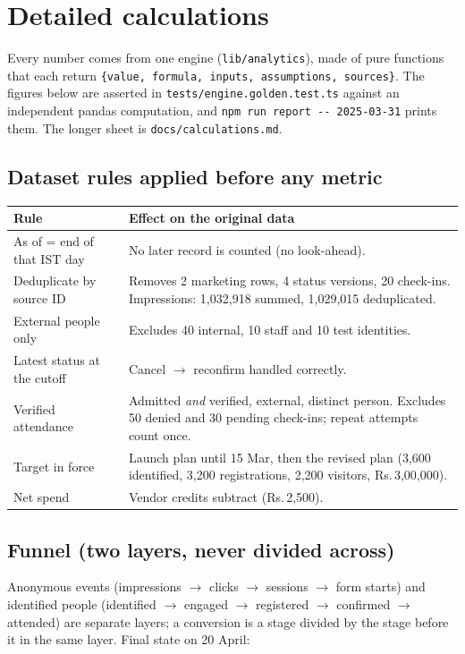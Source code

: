 \documentclass[11pt,a4paper]{article}
\newcommand{\rs}{Rs.\,}
\newcommand{\code}[1]{\texttt{#1}}
\begin{document}
\section{Detailed calculations}\label{sec:calc}
Every number comes from one engine (\code{lib/analytics}), made of pure functions that each return \code{\{value, formula, inputs, assumptions, sources\}}. The figures below are asserted in \code{tests/engine.golden.test.ts} against an independent pandas computation, and \code{npm run report -{}- 2025-03-31} prints them. The longer sheet is \code{docs/calculations.md}.

\subsection{Dataset rules applied before any metric}\label{sec:calc-rules}
\begin{tabularx}{\linewidth}{@{}p{4.2cm}L@{}}
\toprule
\textbf{Rule} & \textbf{Effect on the original data} \\
\midrule
As of = end of that IST day & No later record is counted (no look-ahead). \\
Deduplicate by source ID & Removes 2 marketing rows, 4 status versions, 20 check-ins. Impressions: 1,032,918 summed, 1,029,015 deduplicated. \\
External people only & Excludes 40 internal, 10 staff and 10 test identities. \\
Latest status at the cutoff & Cancel $\to$ reconfirm handled correctly. \\
Verified attendance & Admitted \emph{and} verified, external, distinct person. Excludes 50 denied and 30 pending check-ins; repeat attempts count once. \\
Target in force & Launch plan until 15 Mar, then the revised plan (3,600 identified, 3,200 registrations, 2,200 visitors, \rs3,00,000). \\
Net spend & Vendor credits subtract (\rs2,500). \\
\bottomrule
\end{tabularx}

\subsection{Funnel (two layers, never divided across)}
Anonymous events (impressions $\to$ clicks $\to$ sessions $\to$ form starts) and identified people (identified $\to$ engaged $\to$ registered $\to$ confirmed $\to$ attended) are separate layers; a conversion is a stage divided by the stage before it in the same layer. Final state on 20 April:
\end{document}
